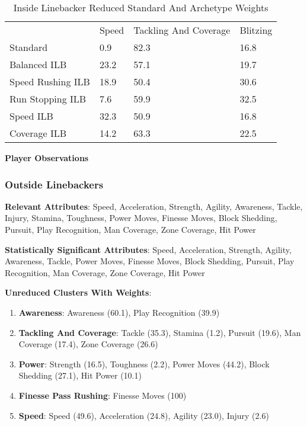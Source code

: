 \documentclass[11pt]{article}
\begin{document}
\begin{table}[]
\centering
\caption{Inside Linebacker Reduced Standard And Archetype Weights}
\label{InsideLinebackerReducedWeights}
\begin{tabular}{llll}
                  & Speed & Tackling And Coverage & Blitzing \\
Standard          & 0.9   & 82.3                  & 16.8     \\
Balanced ILB      & 23.2  & 57.1                  & 19.7     \\
Speed Rushing ILB & 18.9  & 50.4                  & 30.6     \\
Run Stopping ILB  & 7.6   & 59.9                  & 32.5     \\
Speed ILB         & 32.3  & 50.9                  & 16.8     \\
Coverage ILB      & 14.2  & 63.3                  & 22.5    
\end{tabular}
\end{table}

\textbf{Player Observations}

\subsubsection{Outside Linebackers}

\textbf{Relevant Attributes}: Speed, Acceleration, Strength, Agility, Awareness, Tackle, Injury, Stamina, Toughness, Power Moves, Finesse Moves, Block Shedding, Pursuit, Play Recognition, Man Coverage, Zone Coverage, Hit Power

\textbf{Statistically Significant Attributes}: Speed, Acceleration, Strength, Agility, Awareness, Tackle, Power Moves, Finesse Moves, Block Shedding, Pursuit, Play Recognition, Man Coverage, Zone Coverage, Hit Power

\textbf{Unreduced Clusters With Weights}:

\begin{enumerate}
\item{\textbf{Awareness}}: Awareness (60.1), Play Recognition (39.9)
\item{\textbf{Tackling And Coverage}}: Tackle (35.3), Stamina (1.2), Pursuit (19.6), Man Coverage (17.4), Zone Coverage (26.6)
\item{\textbf{Power}}: Strength (16.5), Toughness (2.2), Power Moves (44.2), Block Shedding (27.1), Hit Power (10.1)
\item{\textbf{Finesse Pass Rushing}}: Finesse Moves (100)
\item{\textbf{Speed}}: Speed (49.6), Acceleration (24.8), Agility (23.0), Injury (2.6)
\end{enumerate}
\end{document}
